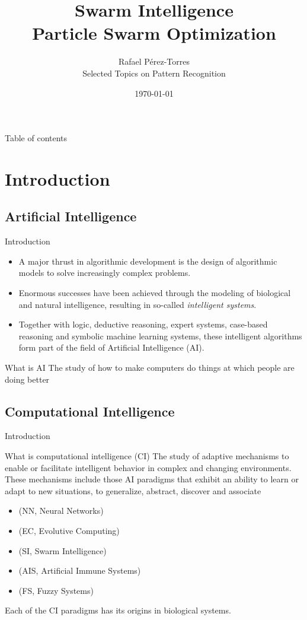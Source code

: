 \documentclass[aspectratio=169,compress,10pt]{beamer}
\author{Rafael P\'{e}rez-Torres \\ Selected Topics on Pattern Recognition}
\title{Swarm Intelligence \\ Particle Swarm Optimization}
\institute{Cinvestav Tamaulipas}
\date{\today}
\begin{document}
\frame{\maketitle}
\begin{frame}{Table of contents}
	\tableofcontents
\end{frame}

\section{Introduction}
\subsection{Artificial Intelligence}

\begin{frame}{Introduction}
\begin{itemize}
	\item A major thrust in algorithmic development is the design of algorithmic models to solve increasingly complex problems.
	\item Enormous successes have been achieved through the modeling of biological and natural intelligence, resulting in so-called \emph{intelligent systems}.
	\item Together with logic, deductive reasoning, expert systems, case-based reasoning and symbolic machine learning systems, these intelligent algorithms form part of the field of Artificial Intelligence (AI).
\end{itemize}

\begin{block}{What is AI}
The study of how to make computers do things at which people are doing better
\end{block}

\end{frame}

\subsection{Computational Intelligence}
\begin{frame}{Introduction}
\begin{block}{What is computational intelligence (CI)}
The study of adaptive mechanisms to enable or facilitate intelligent behavior in complex and changing environments.
These mechanisms include those AI paradigms that exhibit an ability to learn or adapt to new situations, to generalize, abstract, discover and associate
\end{block}
\begin{itemize}
	\item (NN, Neural Networks)
	\item (EC, Evolutive Computing)
	\item (SI, Swarm Intelligence)
	\item (AIS, Artificial Immune Systems)
	\item (FS, Fuzzy Systems)
\end{itemize}
Each of the CI paradigms has its origins in biological systems.
\end{frame}
\end{document}
